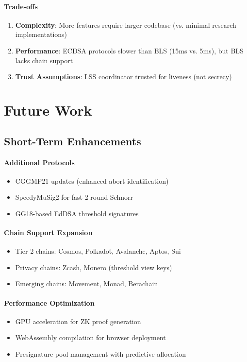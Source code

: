 \documentclass[11pt,twocolumn]{article}
\begin{document}
\paragraph{Trade-offs}
\begin{enumerate}
\item \textbf{Complexity}: More features require larger codebase (vs. minimal research implementations)
\item \textbf{Performance}: ECDSA protocols slower than BLS (15ms vs. 5ms), but BLS lacks chain support
\item \textbf{Trust Assumptions}: LSS coordinator trusted for liveness (not secrecy)
\end{enumerate}

\section{Future Work}

\subsection{Short-Term Enhancements}

\paragraph{Additional Protocols}
\begin{itemize}
\item CGGMP21 updates (enhanced abort identification)
\item SpeedyMuSig2 for fast 2-round Schnorr
\item GG18-based EdDSA threshold signatures
\end{itemize}

\paragraph{Chain Support Expansion}
\begin{itemize}
\item Tier 2 chains: Cosmos, Polkadot, Avalanche, Aptos, Sui
\item Privacy chains: Zcash, Monero (threshold view keys)
\item Emerging chains: Movement, Monad, Berachain
\end{itemize}

\paragraph{Performance Optimization}
\begin{itemize}
\item GPU acceleration for ZK proof generation
\item WebAssembly compilation for browser deployment
\item Presignature pool management with predictive allocation
\end{itemize}
\end{document}

